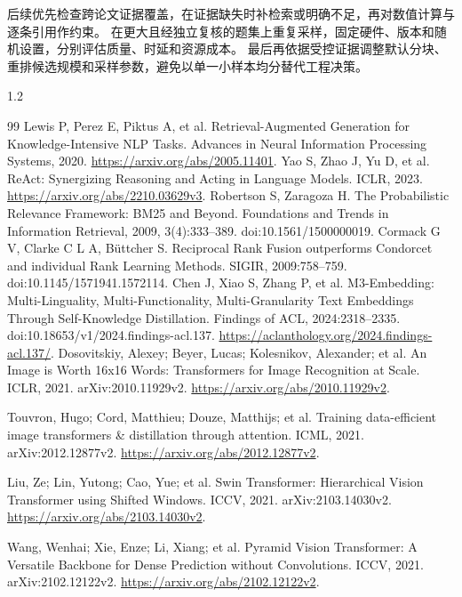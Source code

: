 \documentclass[UTF8,a4paper,zihao=-4,fontset=fandol]{ctexart}
\begin{document}
后续优先检查跨论文证据覆盖，在证据缺失时补检索或明确不足，再对数值计算与逐条引用作约束。
在更大且经独立复核的题集上重复采样，固定硬件、版本和随机设置，分别评估质量、时延和资源成本。
最后再依据受控证据调整默认分块、重排候选规模和采样参数，避免以单一小样本均分替代工程决策。
\FloatBarrier

\begin{spacing}{1.2}\small
\begin{thebibliography}{99}
 Lewis P, Perez E, Piktus A, et al. Retrieval-Augmented Generation for Knowledge-Intensive NLP Tasks. Advances in Neural Information Processing Systems, 2020. \url{https://arxiv.org/abs/2005.11401}.
 Yao S, Zhao J, Yu D, et al. ReAct: Synergizing Reasoning and Acting in Language Models. ICLR, 2023. \url{https://arxiv.org/abs/2210.03629v3}.
 Robertson S, Zaragoza H. The Probabilistic Relevance Framework: BM25 and Beyond. Foundations and Trends in Information Retrieval, 2009, 3(4):333--389. doi:10.1561/1500000019.
 Cormack G V, Clarke C L A, Büttcher S. Reciprocal Rank Fusion outperforms Condorcet and individual Rank Learning Methods. SIGIR, 2009:758--759. doi:10.1145/1571941.1572114.
 Chen J, Xiao S, Zhang P, et al. M3-Embedding: Multi-Linguality, Multi-Functionality, Multi-Granularity Text Embeddings Through Self-Knowledge Distillation. Findings of ACL, 2024:2318--2335. doi:10.18653/v1/2024.findings-acl.137. \url{https://aclanthology.org/2024.findings-acl.137/}.
 Dosovitskiy, Alexey; Beyer, Lucas; Kolesnikov, Alexander; et al. An Image is Worth 16x16 Words: Transformers for Image Recognition at Scale. ICLR, 2021. arXiv:2010.11929v2. \url{https://arxiv.org/abs/2010.11929v2}.

 Touvron, Hugo; Cord, Matthieu; Douze, Matthijs; et al. Training data-efficient image transformers \& distillation through attention. ICML, 2021. arXiv:2012.12877v2. \url{https://arxiv.org/abs/2012.12877v2}.

 Liu, Ze; Lin, Yutong; Cao, Yue; et al. Swin Transformer: Hierarchical Vision Transformer using Shifted Windows. ICCV, 2021. arXiv:2103.14030v2. \url{https://arxiv.org/abs/2103.14030v2}.

 Wang, Wenhai; Xie, Enze; Li, Xiang; et al. Pyramid Vision Transformer: A Versatile Backbone for Dense Prediction without Convolutions. ICCV, 2021. arXiv:2102.12122v2. \url{https://arxiv.org/abs/2102.12122v2}.


\end{thebibliography}
\end{spacing}
\end{document}
